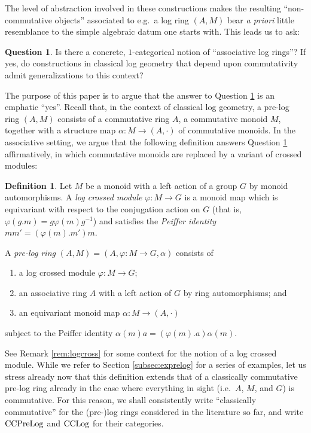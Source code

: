 \documentclass[a4paper,10pt%
]{amsart}
\numberwithin{equation}{section}
\theoremstyle{definition}
\newtheorem{definition}[subsection]{Definition}
\newtheorem{question}[subsection]{Question}
\renewcommand{\:}{\colon}
\begin{document}
The level of abstraction involved in these constructions makes the resulting ``non-commutative objects'' associated to e.g.\ a log ring $(A, M)$ bear \emph{a priori} little resemblance to the simple algebraic datum one starts with. This leads us to ask:

\begin{question}\label{q:asslog} Is there a concrete, $1$-categorical notion of ``associative log rings''? If yes, do constructions in classical log geometry that depend upon commutativity admit generalizations to this context?
\end{question}

The purpose of this paper is to argue that the answer to Question \ref{q:asslog} is an emphatic ``yes''. Recall that, in the context of classical log geometry, a pre-log ring $(A, M)$ consists of a commutative ring $A$, a commutative monoid $M$, together with a structure map $\alpha \colon M \to (A, \cdot)$ of commutative monoids. In the associative setting, we argue that the following definition answers Question \ref{q:asslog} affirmatively, in which commutative monoids are replaced by a variant of crossed modules:

\begin{definition}\label{def:prelog} Let $M$ be a monoid with a left action of a group $G$ by monoid automorphisms. A \emph{log crossed module} $\varphi \colon M \to G$ is a monoid map which is equivariant with respect to the conjugation action on $G$ (that is, $\varphi(g.m) = g\varphi(m)g^{-1}$) and satisfies the \emph{Peiffer identity} $mm' = (\varphi(m).m')m$. 
    
    A \emph{pre-log ring} $(A, M) = (A, \varphi \colon M \to G, \alpha)$ consists of 
\begin{enumerate}
    \item[-] a log crossed module $\varphi \colon M \to G$;
    \item[-] an associative ring $A$ with a left action of $G$ by ring automorphisms; and
    \item[-] an equivariant monoid map $\alpha \colon M \to (A, \cdot)$ 
\end{enumerate}

\noindent subject to the Peiffer identity $\alpha(m)a = (\varphi(m).a)\alpha(m)$. 
\end{definition}

See Remark \ref{rem:logcross} for some context for the notion of a log crossed module. While we refer to Section \ref{subsec:exprelog} for a series of examples, let us stress already now that this definition extends that of a classically commutative pre-log ring already in the case where everything in sight (i.e.\ $A$, $M$, and $G$) is commutative. For this reason, we shall consistently write ``classically commutative'' for the (pre-)log rings considered in the literature so far, and write ${\rm CCPreLog}$ and ${\rm CCLog}$ for their categories. 
\end{document}
